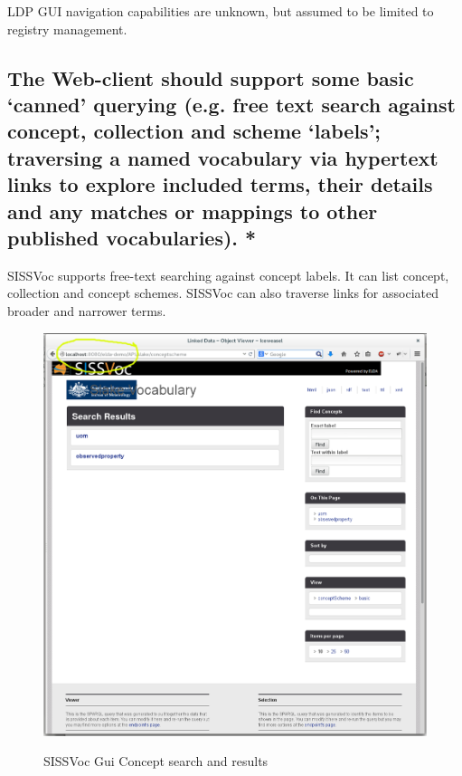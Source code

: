 \documentclass[10pt,a4paper]{article}
\begin{document}
\begin{flushleft}
{  LDP GUI navigation capabilities are unknown, but assumed to be limited to 
  registry management.
  }
%
\subsection{ The Web-client should support some basic ‘canned’ querying (e.g.
free text search against concept, collection and scheme ‘labels’; traversing a
named vocabulary via hypertext links to explore included terms, their details
and any matches or mappings to other published vocabularies). * }
%
  \item SISSVoc supports free-text searching against concept labels. It can list
  concept, collection and concept schemes. SISSVoc can also traverse links 
  for associated broader and narrower terms. 

  \begin{figure}[H]
  \centering
  \caption{SISSVoc Gui Concept search and results}
  \includegraphics[width=12cm]{sissvoc}  
  \label{fig:test}
  \end{figure}





\end{flushleft}
\end{document}
